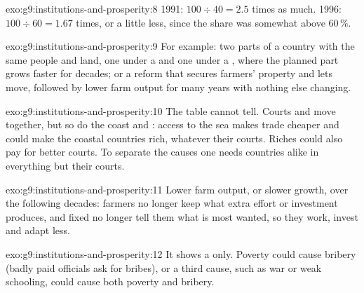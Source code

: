 \begin{solution}{exo:g9:institutions-and-prosperity:8}
1991: $100 \div 40 = 2.5$ times as much. 1996: $100 \div 60 = 1.67$ times, or a little less, since the share
was somewhat above $60\,\%$.
\end{solution}

\begin{solution}{exo:g9:institutions-and-prosperity:9}
For example: two parts of a country with the same people and land, one under a  and one under
a , where the planned part grows faster for decades; or a reform that secures farmers'
property and lets  move, followed by lower farm output for many years with nothing else changing.
\end{solution}

\begin{solution}{exo:g9:institutions-and-prosperity:10}
The table cannot tell. Courts and  move together, but so do the coast and : access to the sea
makes trade cheaper and could make the coastal countries rich, whatever their courts. Riches could also pay
for better courts. To separate the causes one needs countries alike in everything but their courts.
\end{solution}

\begin{solution}{exo:g9:institutions-and-prosperity:11}
Lower farm output, or slower growth, over the following decades: farmers no longer keep what extra effort or
investment produces, and fixed  no longer tell them what is most wanted, so they work, invest and
adapt less.
\end{solution}

\begin{solution}{exo:g9:institutions-and-prosperity:12}
It shows a  only. Poverty could cause bribery (badly paid officials ask for bribes), or a third
cause, such as war or weak schooling, could cause both poverty and bribery.
\end{solution}

